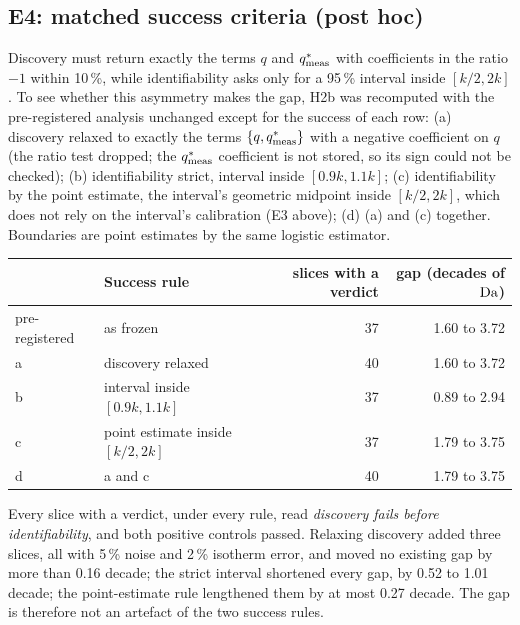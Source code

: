 \subsection*{E4: matched success criteria (post hoc)}
Discovery must return exactly the terms $q$ and $q^{*}_{\mathrm{meas}}$ with coefficients in the ratio $-1$ within
10\,\%, while identifiability asks only for a 95\,\% interval inside $[k/2, 2k]$. To see whether this
asymmetry makes the gap, H2b was recomputed with the pre-registered analysis unchanged except for
the success of each row: (a) discovery relaxed to exactly the terms $\{q, q^{*}_{\mathrm{meas}}\}$ with a negative
coefficient on $q$ (the ratio test dropped; the $q^{*}_{\mathrm{meas}}$ coefficient is not stored, so its sign could
not be checked); (b) identifiability strict, interval inside $[0.9k, 1.1k]$; (c) identifiability by
the point estimate, the interval's geometric midpoint inside $[k/2, 2k]$, which does not rely on
the interval's calibration (E3 above); (d) (a) and (c) together. Boundaries are point estimates
by the same logistic estimator.
\begin{center}
\small
\begin{tabular}{@{}llrr@{}}
\toprule
& Success rule & slices with a verdict & gap (decades of $\mathrm{Da}$) \\
\midrule
pre-registered & as frozen & 37 & 1.60 to 3.72 \\
a & discovery relaxed & 40 & 1.60 to 3.72 \\
b & interval inside $[0.9k, 1.1k]$ & 37 & 0.89 to 2.94 \\
c & point estimate inside $[k/2, 2k]$ & 37 & 1.79 to 3.75 \\
d & a and c & 40 & 1.79 to 3.75 \\
\bottomrule
\end{tabular}
\end{center}
Every slice with a verdict, under every rule, read \emph{discovery fails before identifiability},
and both positive controls passed. Relaxing discovery added three slices, all with 5\,\% noise
and 2\,\% isotherm error, and moved no existing gap by more than 0.16 decade; the strict interval
shortened every gap, by 0.52 to 1.01 decade; the point-estimate rule lengthened them by at most
0.27 decade. The gap is therefore not an artefact of the two success rules.


